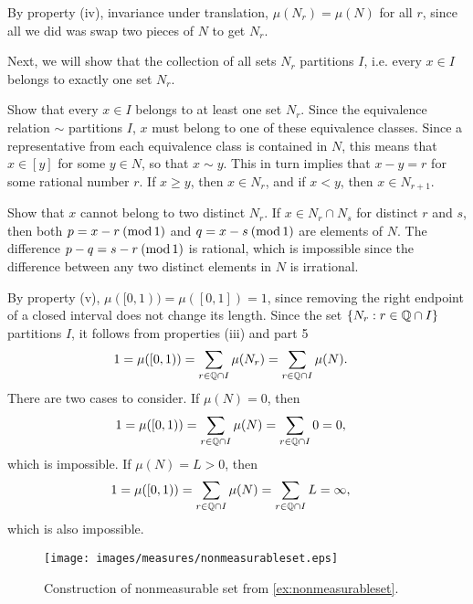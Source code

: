 \documentclass[main.tex]{subfiles}
\begin{document}
\begin{example}
\begin{remunerate}
	\item By property (iv), invariance under translation, $\mu(N_r) = \mu(N)$ for all $r$, since all we did was swap two pieces of $N$ to get $N_r$.
	\item Next, we will show that the collection of all sets $N_r$ partitions $I$, i.e. every $x \in I$ belongs to exactly one set $N_r$. 
	\begin{bulletlist} 
	\item Show that every $x \in I$ belongs to at least one set $N_r$. Since the equivalence relation $\sim$ partitions $I$, $x$ must belong to one of these equivalence classes. Since a representative from each equivalence class is contained in $N$, this means that $x \in [y]$ for some $y \in N$, so that $x \sim y$. This in turn implies that $x - y = r$ for some rational number $r$. If $x \geq y$, then $x \in N_r$, and if $x < y$, then $x \in N_{r+1}$.
	\item Show that $x$ cannot belong to two distinct $N_r$. If $x \in N_r \cap N_s$ for distinct $r$ and $s$, then both $p = x - r\:(\operatorname{mod} 1)$ and $q = x - s\:(\operatorname{mod} 1)$ are elements of $N$. The difference $p - q = s - r\:(\operatorname{mod} 1)$ is rational, which is impossible since the difference between any two distinct elements in $N$ is irrational.
	\end{bulletlist}
	\item By property (v), $\mu( [0, 1) ) = \mu( [0, 1] ) = 1$, since removing the right endpoint of a closed interval does not change its length. Since the set $\{ N_r : r \in \mathbb{Q} \cap I \}$ partitions $I$, it follows from properties (iii)  and part 5
	\begin{align*}
	1 = \mu( [0, 1) ) &= \sum_{r \in \mathbb{Q} \cap I} \mu(N_r) = \sum_{r \in \mathbb{Q} \cap I} \mu(N).
	\end{align*}
	There are two cases to consider. If $\mu(N) = 0$, then
	\begin{align*}
	1 = \mu( [0, 1) ) &= \sum_{r \in \mathbb{Q} \cap I} \mu(N) = \sum_{r \in \mathbb{Q} \cap I} 0 = 0,
	\end{align*}
	which is impossible. If $\mu(N) = L > 0$, then
	\begin{align*}
	1 = \mu( [0, 1) ) &= \sum_{r \in \mathbb{Q} \cap I} \mu(N) = \sum_{r \in \mathbb{Q} \cap I} L = \infty,
	\end{align*}
	which is also impossible.
\end{remunerate}
\end{example}

\begin{figure}
\centerline{\texttt{[image: images/measures/nonmeasurableset.eps]}}
\caption{Construction of nonmeasurable set from \cref{ex:nonmeasurableset}.}
\label{fig:nonmeasurableset}
\end{figure}
\end{document}
